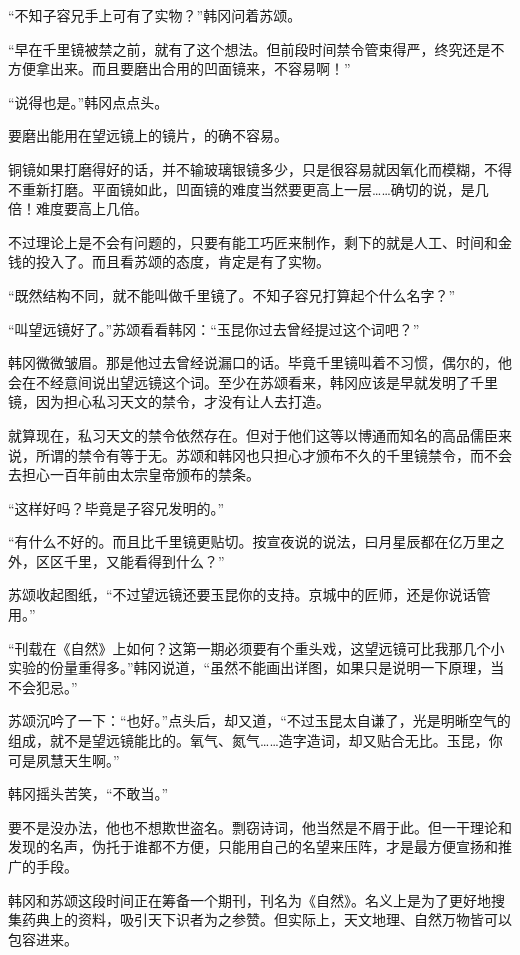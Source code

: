 “不知子容兄手上可有了实物？”韩冈问着苏颂。

“早在千里镜被禁之前，就有了这个想法。但前段时间禁令管束得严，终究还是不方便拿出来。而且要磨出合用的凹面镜来，不容易啊！”

“说得也是。”韩冈点点头。

要磨出能用在望远镜上的镜片，的确不容易。

铜镜如果打磨得好的话，并不输玻璃银镜多少，只是很容易就因氧化而模糊，不得不重新打磨。平面镜如此，凹面镜的难度当然要更高上一层……确切的说，是几倍！难度要高上几倍。

不过理论上是不会有问题的，只要有能工巧匠来制作，剩下的就是人工、时间和金钱的投入了。而且看苏颂的态度，肯定是有了实物。

“既然结构不同，就不能叫做千里镜了。不知子容兄打算起个什么名字？”

“叫望远镜好了。”苏颂看看韩冈：“玉昆你过去曾经提过这个词吧？”

韩冈微微皱眉。那是他过去曾经说漏口的话。毕竟千里镜叫着不习惯，偶尔的，他会在不经意间说出望远镜这个词。至少在苏颂看来，韩冈应该是早就发明了千里镜，因为担心私习天文的禁令，才没有让人去打造。

就算现在，私习天文的禁令依然存在。但对于他们这等以博通而知名的高品儒臣来说，所谓的禁令有等于无。苏颂和韩冈也只担心才颁布不久的千里镜禁令，而不会去担心一百年前由太宗皇帝颁布的禁条。

“这样好吗？毕竟是子容兄发明的。”

“有什么不好的。而且比千里镜更贴切。按宣夜说的说法，曰月星辰都在亿万里之外，区区千里，又能看得到什么？”

苏颂收起图纸，“不过望远镜还要玉昆你的支持。京城中的匠师，还是你说话管用。”

“刊载在《自然》上如何？这第一期必须要有个重头戏，这望远镜可比我那几个小实验的份量重得多。”韩冈说道，“虽然不能画出详图，如果只是说明一下原理，当不会犯忌。”

苏颂沉吟了一下：“也好。”点头后，却又道，“不过玉昆太自谦了，光是明晰空气的组成，就不是望远镜能比的。氧气、氮气……造字造词，却又贴合无比。玉昆，你可是夙慧天生啊。”

韩冈摇头苦笑，“不敢当。”

要不是没办法，他也不想欺世盗名。剽窃诗词，他当然是不屑于此。但一干理论和发现的名声，伪托于谁都不方便，只能用自己的名望来压阵，才是最方便宣扬和推广的手段。

韩冈和苏颂这段时间正在筹备一个期刊，刊名为《自然》。名义上是为了更好地搜集药典上的资料，吸引天下识者为之参赞。但实际上，天文地理、自然万物皆可以包容进来。

